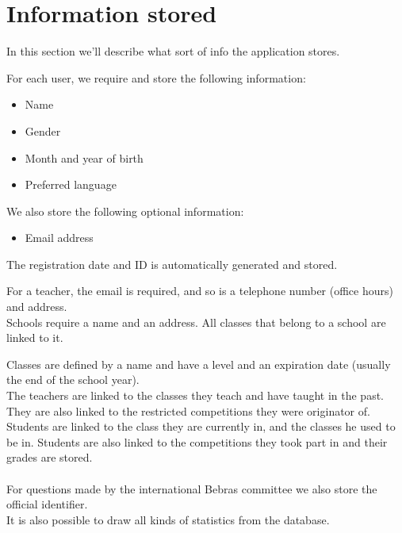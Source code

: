 
\section{Information stored}
In this section we'll describe what sort of info the application stores.

For each user, we require and store the following information:\\
\begin{itemize}
\item Name
\item Gender
\item Month and year of birth
\item Preferred language
\end{itemize} 


We also store the following optional information:
\begin{itemize}
\item Email address
\end{itemize}


The registration date and ID is automatically generated and stored.

For a teacher, the email is required, and so is a telephone number (office hours) and address.
\\
Schools require a name and an address. All classes that belong to a school are linked to it.

Classes are defined by a name and have a level and an expiration date (usually the end of the school year). \\

The teachers are linked to the classes they teach and have taught in the past. They are also linked to the restricted competitions they were originator of. Students are linked to the class they are currently in, and the classes he used to be in. Students are also linked to the competitions they took part in and their grades are stored. 
\\ \\
For questions made by the international Bebras committee we also store the official identifier.\\
It is also possible to draw all kinds of statistics from the database.
